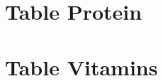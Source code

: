 \documentclass[../main.tex]{subfiles}
\begin{document}
\section{Table Protein}



\section{Table Vitamins}


\end{document}
